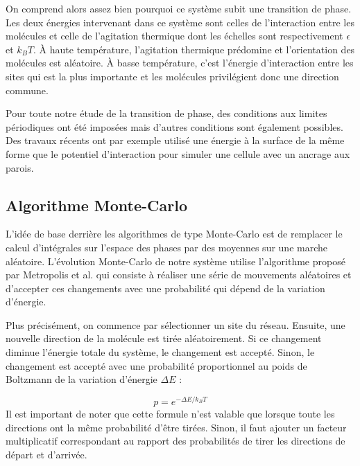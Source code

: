 \documentclass[11pt,a4paper]{article}
\numberwithin{equation}{section}
\begin{document}
On comprend alors assez bien pourquoi ce système subit une transition de phase. Les deux énergies intervenant dans ce système sont celles de l'interaction entre les molécules et celle de l'agitation thermique dont les échelles sont respectivement $\epsilon$ et $k_B T$.
À haute température, l'agitation thermique prédomine et l'orientation des molécules est aléatoire. À basse température, c'est l'énergie d'interaction entre les sites qui est la plus importante et les molécules privilégient donc une direction commune.\medskip

Pour toute notre étude de la transition de phase, des conditions aux limites périodiques ont été imposées mais d'autres conditions sont également possibles. Des travaux récents \cite{confined} ont par exemple utilisé une énergie à la surface de la même forme que le potentiel d'interaction pour simuler une cellule avec un ancrage aux parois. 


\subsection{Algorithme Monte-Carlo}

L'idée de base derrière les algorithmes de type Monte-Carlo est de remplacer le calcul d'intégrales sur l'espace des phases par des moyennes sur une marche aléatoire. L'évolution Monte-Carlo de notre système utilise l'algorithme proposé par Metropolis et al. \cite{metropolis} qui consiste à réaliser une série de mouvements aléatoires et d'accepter ces changements avec une probabilité qui dépend de la variation d'énergie.\medskip

Plus précisément, on commence par sélectionner un site du réseau. Ensuite, une nouvelle direction de la molécule est tirée aléatoirement. Si ce changement diminue l'énergie totale du système, le changement est accepté. Sinon, le changement est accepté avec une probabilité proportionnel au poids de Boltzmann de la variation d'énergie $\Delta E$ :

\begin{equation}
p = e^{-\Delta E / k_B T}
\label{boltzmannprob}
\end{equation}
Il est important de noter que cette formule n'est valable que lorsque toute les directions ont la même probabilité d'être tirées. Sinon, il faut ajouter un facteur multiplicatif correspondant au rapport des probabilités de tirer les directions de départ et d'arrivée.
\medskip
\end{document}

